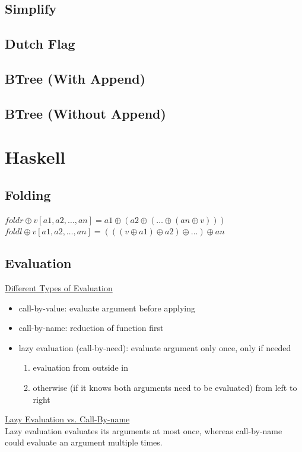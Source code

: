 \documentclass[10pt,landscape,a4paper]{article}
\begin{document}
\begin{multicols*}{5}
\subsection*{Simplify}

\subsection*{Dutch Flag}

\subsection*{BTree (With Append)}

\subsection*{BTree (Without Append)}

\section{Haskell}

\subsection*{Folding}
\(foldr \oplus v [a1,a2,\ldots,an] = a1 \oplus (a2 \oplus (\ldots \oplus (an \oplus v)))\) \\
\(foldl \oplus v [a1,a2,\ldots,an] = (((v \oplus a1) \oplus a2) \oplus \ldots) \oplus an\)

\subsection*{Evaluation}
\underline{Different Types of Evaluation}
\begin{itemize}
    \item call-by-value: evaluate argument before applying
    \item call-by-name:  reduction of function first
    \item lazy evaluation (call-by-need): evaluate argument only once, only if needed
    \begin{enumerate}
        \item evaluation from outside in
        \item otherwise (if it knows both arguments need to be evaluated)
        from left to right
    \end{enumerate}
\end{itemize}
\underline{Lazy Evaluation vs. Call-By-name} \\
Lazy evaluation evaluates its arguments at most once, whereas call-by-name could evaluate an argument multiple times.


\end{multicols*}
\end{document}
